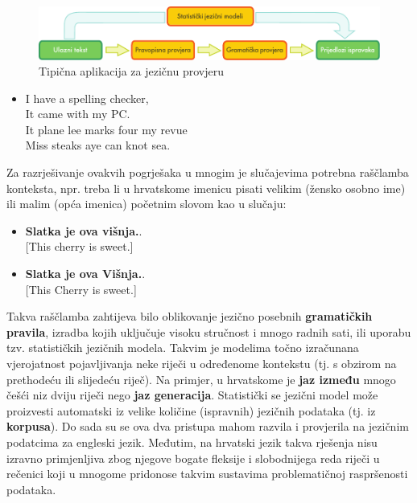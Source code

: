 \begin{multicols}{2}
\begin{figure}[t]
  \center
  \includegraphics[width=\textwidth]{../_media/croatian/language_checking}
  \caption{Tipična aplikacija za jezičnu provjeru}
  \label{fig:langcheckingaarch_cro}
\end{figure}

\begin{itemize}
\item[] I have a spelling checker,\\
  It came with my PC.\\
  It plane lee marks four my revue\\
  Miss steaks aye can knot sea.
\end{itemize}

Za razrješivanje ovakvih pogrješaka u mnogim je slučajevima potrebna raščlamba konteksta, npr. treba li u hrvatskome imenicu pisati velikim  (žensko osobno ime) ili malim (opća imenica) početnim slovom kao u slučaju:

\begin{itemize}
\item \textbf{Slatka je ova višnja.}.\\
  {[}This cherry is sweet.{]} 
\item \textbf{Slatka je ova Višnja.}.\\
  {[}This Cherry is sweet.{]}
\end{itemize}

Takva raščlamba zahtijeva bilo oblikovanje jezično posebnih \textbf{gramatičkih pravila}, izradba kojih uključuje visoku stručnost i mnogo radnih sati, ili uporabu tzv. statističkih jezičnih modela. Takvim je modelima točno izračunana vjerojatnost pojavljivanja neke riječi u određenome kontekstu (tj. s obzirom na prethodeću ili slijedeću riječ). Na primjer, u hrvatskome je \textbf{jaz između} mnogo češći niz dviju riječi nego \textbf{jaz generacija}. Statistički se jezični model može proizvesti automatski iz velike količine (ispravnih) jezičnih podataka (tj. iz \textbf{korpusa}). Do sada su se ova dva pristupa mahom razvila i provjerila na jezičnim podatcima za engleski jezik. Međutim, na hrvatski jezik takva rješenja nisu izravno primjenljiva zbog njegove bogate fleksije i slobodnijega reda riječi u rečenici koji u mnogome pridonose takvim sustavima problematičnoj raspršenosti podataka.


\end{multicols}
